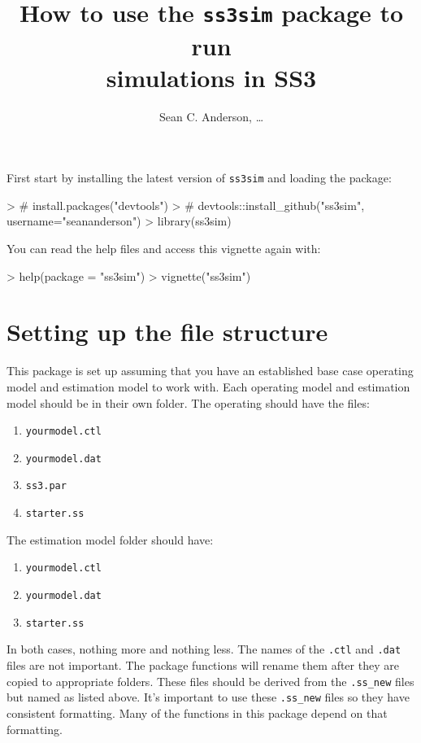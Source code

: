 \documentclass[12pt]{article}
\title{How to use the \texttt{ss3sim} package to run\\simulations in SS3}
\author{Sean C. Anderson, \ldots}
\date{}
\begin{document}
\maketitle

\noindent
First start by installing the latest version of \texttt{ss3sim} and loading the 
package:

\begin{Schunk}
\begin{Sinput}
> # install.packages("devtools")
> # devtools::install_github("ss3sim", username="seananderson")
> library(ss3sim)
\end{Sinput}
\end{Schunk}

\noindent
You can read the help files and access this vignette again with:

\begin{Schunk}
\begin{Sinput}
> help(package = "ss3sim")
> vignette("ss3sim")
\end{Sinput}
\end{Schunk}

\section*{Setting up the file structure}
This package is set up assuming that you have an established base case 
operating model and estimation model to work with. Each operating model and 
estimation model should be in their own folder. The operating should have the 
files:
\begin{enumerate}
  \item \texttt{yourmodel.ctl}
  \item \texttt{yourmodel.dat}
  \item \texttt{ss3.par}
  \item \texttt{starter.ss}
\end{enumerate}

The estimation model folder should have:

\begin{enumerate}
  \item \texttt{yourmodel.ctl}
  \item \texttt{yourmodel.dat}
  \item \texttt{starter.ss}
\end{enumerate}

In both cases, nothing more and nothing less. The names of the \texttt{.ctl} 
and \texttt{.dat} files are not important. The package functions will rename 
them after they are copied to appropriate folders. These files should be 
derived from the \texttt{.ss\_new} files but named as listed above. It's 
important to use these \texttt{.ss\_new} files so they have consistent 
formatting. Many of the functions in this package depend on that formatting.
\end{document}
